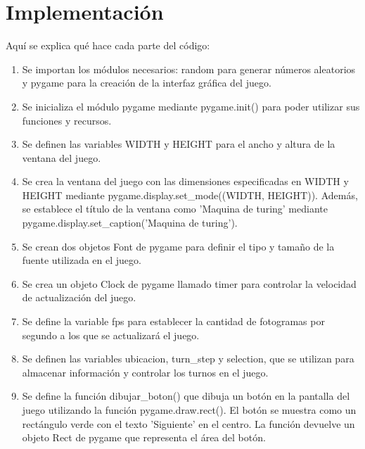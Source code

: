 \section{Implementación} 
Aquí se explica qué hace cada parte del código:\newline
\\
\begin{enumerate}
    \item Se importan los módulos necesarios: random para generar números aleatorios y pygame para la creación de la interfaz gráfica del juego.\newline

    \item Se inicializa el módulo pygame mediante pygame.init() para poder utilizar sus funciones y recursos.\newline
    
    \item Se definen las variables WIDTH y HEIGHT para el ancho y altura de la ventana del juego.\newline
    
    \item Se crea la ventana del juego con las dimensiones especificadas en WIDTH y HEIGHT mediante pygame.display.set\_mode((WIDTH, HEIGHT)). Además, se establece el título de la ventana como 'Maquina de turing' mediante pygame.display.set\_caption('Maquina de turing').\newline
    
    \item Se crean dos objetos Font de pygame para definir el tipo y tamaño de la fuente utilizada en el juego.\newline
    
    \item Se crea un objeto Clock de pygame llamado timer para controlar la velocidad de actualización del juego.\newline
    
    \item Se define la variable fps para establecer la cantidad de fotogramas por segundo a los que se actualizará el juego.\newline
    
    \item Se definen las variables ubicacion, turn\_step y selection, que se utilizan para almacenar información y controlar los turnos en el juego.\newline
    
    \item Se define la función dibujar\_boton() que dibuja un botón en la pantalla del juego utilizando la función pygame.draw.rect(). El botón se muestra como un rectángulo verde con el texto 'Siguiente' en el centro. La función devuelve un objeto Rect de pygame que representa el área del botón.\newline
    

\end{enumerate}
